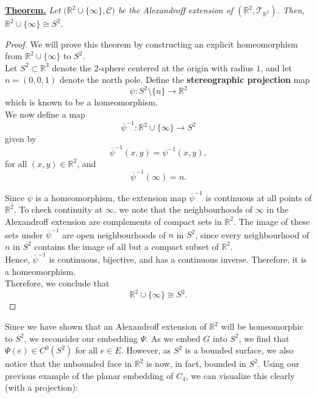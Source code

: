\documentclass{article}
\begin{document}
\begin{bluebox}
\noindent\underline{\textbf{Theorem.}} \textit{Let $\bigl(\mathbb{R}^{2} \cup \{\infty\}, \mathcal{C}\bigr)$ be the Alexandroff extension of $(\mathbb{R}^{2}, \mathcal{T}_{\mathbb{R}^{2}})$. Then, $\mathbb{R}^{2} \cup \{\infty\} \cong S^{2}$.}
\end{bluebox}
\begin{proof}
    We will prove this theorem by constructing an explicit homeomorphism from $\mathbb{R}^{2} \cup \{\infty\}$ to $S^{2}$.\\
    
    \noindent Let $S^{2} \subset \mathbb{R}^{3}$ denote the 2-sphere centered at the origin with radius $1$, and let $n = (0,0,1)$ denote the north pole. Define the \textbf{stereographic projection}\footnotemark{} map
    \[\psi : S^{2} \setminus \{n\} \longrightarrow \mathbb{R}^{2}\]
    which is known to be a homeomorphism.\\
    
    \noindent We now define a map
    \[
    \overline{\psi}^{-1} : \mathbb{R}^{2} \cup \{\infty\} \longrightarrow S^{2}
    \]
    given by
    \[\overline{\psi}^{-1}(x,y) = \psi^{-1}(x,y),\]
    for all $(x,y) \in \mathbb{R}^{2}$, and 
    \[\overline{\psi}^{-1}(\infty) = n.\]

    \noindent Since $\psi$ is a homeomorphism, the extension map $\overline{\psi}^{-1}$ is continuous at all points of $\mathbb{R}^{2}$. To check continuity at $\infty$, we note that the neighbourhoods of $\infty$ in the Alexandroff extension are complements of compact sets in $\mathbb{R}^{2}$. The image of these sets under $\overline{\psi}^{-1}$ are open neighbourhoods of $n$ in $S^{2}$, since every neighbourhood of $n$ in $S^{2}$ contains the image of all but a compact subset of $\mathbb{R}^{2}$.\\
    
    \noindent Hence, $\overline{\psi}^{-1}$ is continuous, bijective, and has a continuous inverse. Therefore, it is a homeomorphism.\\
    
    \noindent Therefore, we conclude that
    \[\mathbb{R}^{2} \cup \{\infty\} \cong S^{2}.\]
\end{proof}

\noindent Since we have shown that an Alexandroff extension of $\mathbb{R}^{2}$ will be homeomorphic to $S^{2}$, we reconsider our embedding $\Psi$. As we embed $G$ into $S^{2}$, we find that $\Psi(e) \in C^{0}(S^{2})$ for all $e\in E$. However, as $S^{2}$ is a bounded surface, we also notice that the unbounded face in $\mathbb{R}^{2}$ is now, in fact, bounded in $S^{2}$. Using our previous example of the planar embedding of $C_{4}$, we can visualize this clearly (with a projection):
\end{document}
